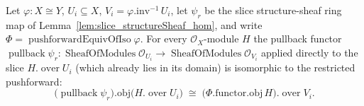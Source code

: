 \begin{lemma}
  \label{lem:pushforward_slice_pullback_iso}
  Let \(\varphi : X \cong Y\), \(U_i \subseteq X\), \(V_i = \varphi.\mathrm{inv}^{-1}\,U_i\), let
  \(\psi_r\) be the slice structure-sheaf ring map of Lemma~\ref{lem:slice_structureSheaf_hom}, and write
  \(\Phi = \operatorname{pushforwardEquivOfIso}\varphi\). For every \(\mathcal{O}_X\)-module \(H\) the
  pullback functor \(\operatorname{pullback}\psi_r : \operatorname{SheafOfModules}\mathcal{O}_{U_i} \to
  \operatorname{SheafOfModules}\mathcal{O}_{V_i}\) applied directly to the slice
  \(H.\operatorname{over} U_i\) (which already lies in its domain) is isomorphic to the restricted
  pushforward:
  \[
    \bigl(\operatorname{pullback}\psi_r\bigr).\mathrm{obj}\bigl(H.\operatorname{over} U_i\bigr)
      \;\cong\;
    \bigl(\Phi.\mathrm{functor}.\mathrm{obj}\, H\bigr).\operatorname{over} V_i .
  \]
\end{lemma}
